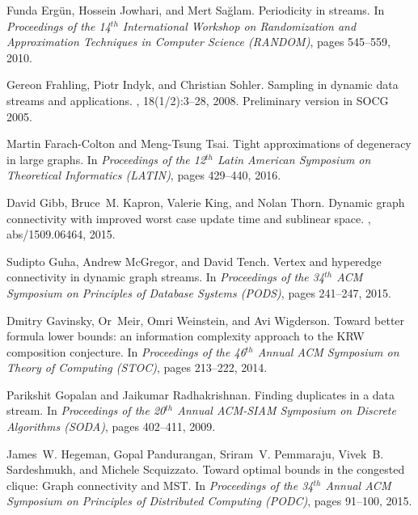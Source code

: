 \documentclass[11pt]{article}
\begin{document}
\begin{thebibliography}{GMWW14}
Funda Erg{\"{u}}n, Hossein Jowhari, and Mert Sa{\u{g}}lam.
\newblock Periodicity in streams.
\newblock In {\em Proceedings of the 14$^{th}$ International Workshop on
  Randomization and Approximation Techniques in Computer Science (RANDOM)},
  pages 545--559, 2010.

Gereon Frahling, Piotr Indyk, and Christian Sohler.
\newblock Sampling in dynamic data streams and applications.
, 18(1/2):3--28, 2008.
\newblock Preliminary version in SOCG 2005.

Martin Farach{-}Colton and Meng{-}Tsung Tsai.
\newblock Tight approximations of degeneracy in large graphs.
\newblock In {\em Proceedings of the 12$^{th}$ Latin American Symposium on
  Theoretical Informatics (LATIN)}, pages 429--440, 2016.

David Gibb, Bruce~M. Kapron, Valerie King, and Nolan Thorn.
\newblock Dynamic graph connectivity with improved worst case update time and
  sublinear space.
, abs/1509.06464, 2015.

Sudipto Guha, Andrew McGregor, and David Tench.
\newblock Vertex and hyperedge connectivity in dynamic graph streams.
\newblock In {\em Proceedings of the 34$^{th}$ {ACM} Symposium on Principles of
  Database Systems (PODS)}, pages 241--247, 2015.

Dmitry Gavinsky, Or~Meir, Omri Weinstein, and Avi Wigderson.
\newblock Toward better formula lower bounds: an information complexity
  approach to the {KRW} composition conjecture.
\newblock In {\em Proceedings of the 46$^{th}$ Annual ACM Symposium on Theory
  of Computing (STOC)}, pages 213--222, 2014.

Parikshit Gopalan and Jaikumar Radhakrishnan.
\newblock Finding duplicates in a data stream.
\newblock In {\em Proceedings of the 20$^{th}$ Annual {ACM-SIAM} Symposium on
  Discrete Algorithms (SODA)}, pages 402--411, 2009.

James~W. Hegeman, Gopal Pandurangan, Sriram~V. Pemmaraju, Vivek~B. Sardeshmukh,
  and Michele Scquizzato.
\newblock Toward optimal bounds in the congested clique: Graph connectivity and
  {MST}.
\newblock In {\em Proceedings of the 34$^{th}$ Annual {ACM} Symposium on
  Principles of Distributed Computing (PODC)}, pages 91--100, 2015.


\end{thebibliography}
\end{document}
